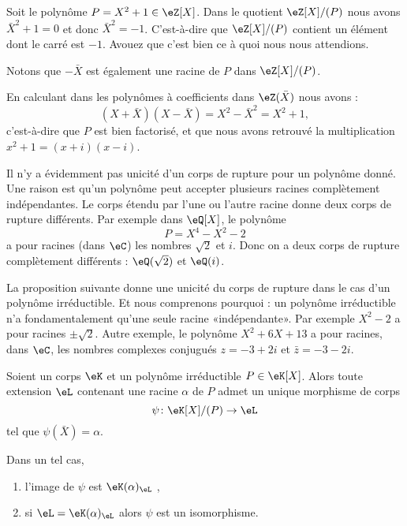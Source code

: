 \begin{example}
	Soit le polynôme \( P=X^2+1\in \eZ[X]\). Dans le quotient \( \eZ[X]/(P)\) nous avons \( \bar X^2+1=0\) et donc \( \bar X^2=-1\). C'est-à-dire que \( \eZ[X]/(P)\) contient un élément dont le carré est \( -1\). Avouez que c'est bien ce à quoi nous nous attendions.

	Notons que \( -\bar X\) est également une racine de \( P\) dans \( \eZ[X]/(P)\).

	En calculant dans les polynômes à coefficients dans \( \eZ(\bar X)\) nous avons :
	\begin{equation}
		(X+\bar X)(X-\bar X)=X^2-\bar X^2=X^2+1,
	\end{equation}
	c'est-à-dire que \( P\) est bien factorisé, et que nous avons retrouvé la multiplication \( x^2+1=(x+i)(x-i)\).
\end{example}

\begin{normaltext}
	Il n'y a évidemment pas unicité d'un corps de rupture pour un polynôme donné. Une raison est qu'un polynôme peut accepter plusieurs racines complètement indépendantes. Le corps étendu par l'une ou l'autre racine donne deux corps de rupture différents. Par exemple dans \( \eQ[X]\), le polynôme
	\begin{equation}
		P=X^4-X^2-2
	\end{equation}
	a pour racines (dans \( \eC\)) les nombres \( \sqrt{ 2 }\) et \( i\). Donc on a deux corps de rupture complètement différents : \( \eQ(\sqrt{ 2 })\) et \( \eQ(i)\).
\end{normaltext}

\begin{normaltext}
	La proposition suivante donne une unicité du corps de rupture dans le cas d'un polynôme irréductible. Et nous comprenons pourquoi : un polynôme irréductible n'a fondamentalement qu'une seule racine «indépendante». Par exemple \( X^2-2\) a pour racines \( \pm\sqrt{ 2 }\). Autre exemple, le polynôme \( X^2+6X+13\) a pour racines, dans \( \eC\), les nombres complexes conjugués \( z=-3+2i\) et \( \bar z=-3-2i\).
\end{normaltext}

\begin{proposition}          \label{PROPooVJACooNDmlfb}
	Soient un corps \( \eK\) et un polynôme irréductible \( P\in \eK[X]\). Alors toute extension \( \eL\) contenant une racine \( \alpha\) de \( P\) admet un unique morphisme de corps
	\begin{equation}
		\psi\colon \eK[X]/(P)\to \eL
	\end{equation}
	tel que \( \psi(\bar X)=\alpha\).

	Dans un tel cas,
	\begin{enumerate}
		\item
		      l'image de \( \psi\) est \( \eK(\alpha)_{\eL}\) ,
		\item       \label{ITEMooHRFHooWLIdWU}
		      si \( \eL=\eK(\alpha)_{\eL}\) alors \( \psi\) est un isomorphisme.
	\end{enumerate}

\end{proposition}

